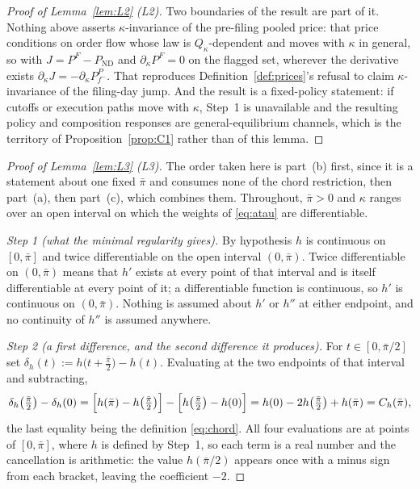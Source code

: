\documentclass[11pt]{article}
\newcommand{\ND}{\mathrm{ND}}
\begin{document}
\begin{proof}[Proof of Lemma~\ref{lem:L2} (L2)]
Two boundaries of the result are part of it. Nothing above asserts $\kappa$-invariance of the
pre-filing pooled price: that price conditions on order flow whose law is $Q_\kappa$-dependent and
moves with $\kappa$ in general, so with $J = P^F - P_{\ND}$ and $\partial_\kappa P^F = 0$ on the
flagged set, wherever the derivative exists $\partial_\kappa J = -\partial_\kappa P_{f^-}^P$. That
reproduces Definition~\ref{def:prices}'s refusal to claim $\kappa$-invariance of the filing-day jump.
And the result is a fixed-policy statement: if cutoffs or execution paths move with $\kappa$, Step~1
is unavailable and the resulting policy and composition responses are general-equilibrium channels,
which is the territory of Proposition~\ref{prop:C1} rather than of this lemma.
\end{proof}

\begin{proof}[Proof of Lemma~\ref{lem:L3} (L3)]
The order taken here is part~(b) first, since it is a statement about one fixed $\bar\pi$ and
consumes none of the chord restriction, then part~(a), then part~(c), which combines them.
Throughout, $\bar\pi > 0$ and $\kappa$ ranges over an open interval on which the weights of
\eqref{eq:atau} are differentiable.

\emph{Step 1 (what the minimal regularity gives).} By hypothesis $h$ is continuous on $[0,\bar\pi]$
and twice differentiable on the open interval $(0,\bar\pi)$. Twice differentiable on $(0,\bar\pi)$
means that $h'$ exists at every point of that interval and is itself differentiable at every point of
it; a differentiable function is continuous, so $h'$ is continuous on $(0,\bar\pi)$. Nothing is
assumed about $h'$ or $h''$ at either endpoint, and no continuity of $h''$ is assumed anywhere.

\emph{Step 2 (a first difference, and the second difference it produces).} For
$t \in [0,\bar\pi/2]$ set $\delta_h(t) := h\bigl(t+\tfrac{\bar\pi}{2}\bigr) - h(t)$. Evaluating at the
two endpoints of that interval and subtracting,
\begin{equation}
\label{eq:L3-seconddiff}
\delta_h\!\left(\tfrac{\bar\pi}{2}\right) - \delta_h(0)
 = \Bigl[h(\bar\pi)-h\!\left(\tfrac{\bar\pi}{2}\right)\Bigr]
 - \Bigl[h\!\left(\tfrac{\bar\pi}{2}\right)-h(0)\Bigr]
 = h(0) - 2h\!\left(\tfrac{\bar\pi}{2}\right) + h(\bar\pi) = C_h(\bar\pi),
\end{equation}
the last equality being the definition \eqref{eq:chord}. All four evaluations are at points of
$[0,\bar\pi]$, where $h$ is defined by Step~1, so each term is a real number and the cancellation is
arithmetic: the value $h(\bar\pi/2)$ appears once with a minus sign from each bracket, leaving the
coefficient $-2$.


\end{proof}
\end{document}
